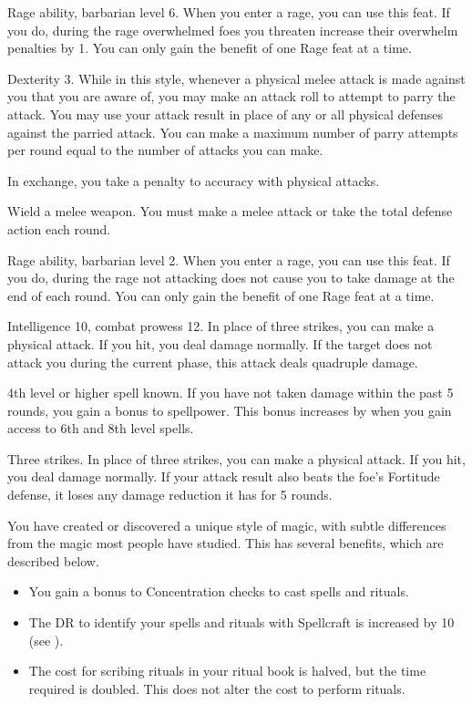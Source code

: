 \featpres Rage ability, barbarian level 6.
\featben When you enter a rage, you can use this feat. If you do, during the rage overwhelmed foes you threaten increase their overwhelm penalties by 1.
 You can only gain the benefit of one Rage feat at a time.

\featpre Dexterity 3.
\featben While in this style, whenever a physical melee attack is made against you that you are aware of, you may make an attack roll to attempt to parry the attack.
You may use your attack result in place of any or all physical defenses against the parried attack.
You can make a maximum number of parry attempts per round equal to the number of attacks you can make.

In exchange, you take a  penalty to accuracy with physical attacks.

\stylereq Wield a melee weapon.
You must make a melee attack or take the total defense action each round.

\featpres Rage ability, barbarian level 2.
\featben When you enter a rage, you can use this feat. If you do, during the rage not attacking does not cause you to take damage at the end of each round.
 You can only gain the benefit of one Rage feat at a time.

\featpres Intelligence 10, combat prowess 12.
\featben In place of three strikes, you can make a physical attack.
If you hit, you deal damage normally.
If the target does not attack you during the current phase, this attack deals quadruple damage.

\featpre 4th level or higher  spell known.
\featben If you have not taken damage within the past 5 rounds, you gain a  bonus to spellpower.
This bonus increases by  when you gain access to 6th and 8th level spells.

\featpre Three strikes.
\featben In place of three strikes, you can make a physical attack.
If you hit, you deal damage normally.
If your attack result also beats the foe's Fortitude defense, it loses any damage reduction it has for 5 rounds.

\featben You have created or discovered a unique style of magic, with subtle differences from the magic most people have studied.
This has several benefits, which are described below.
\begin{itemize}
    \item You gain a  bonus to Concentration checks to cast spells and rituals.
    \item The DR to identify your spells and rituals with Spellcraft is increased by 10 (see ).
    \item The cost for scribing rituals in your ritual book is halved, but the time required is doubled.
        This does not alter the cost to perform rituals.
\end{itemize}

